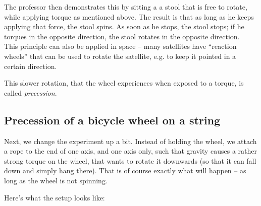 The professor then demonstrates this by sitting a a stool that is free to rotate, while applying torque as mentioned above. The result is that as long as he keeps applying that force, the stool spins. As soon as he stops, the stool stops; if he torques in the opposite direction, the stool rotates in the opposite direction.\\
This principle can also be applied in space -- many satellites have ``reaction wheels'' that can be used to rotate the satellite, e.g. to keep it pointed in a certain direction.

This slower rotation, that the wheel experiences when exposed to a torque, is called \emph{precession}.

\subsection{Precession of a bicycle wheel on a string}

Next, we change the experiment up a bit. Instead of holding the wheel, we attach a rope to the end of one axis, and one axis only, such that gravity causes a rather strong torque on the wheel, that wants to rotate it downwards (so that it can fall down and simply hang there). That is of course exactly what will happen -- as long as the wheel is not spinning.

Here's what the setup looks like:

\begin{figure}[H]
  \centering
{}
\end{figure}

